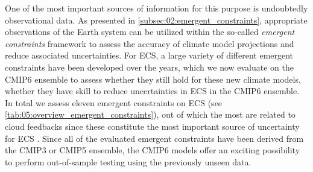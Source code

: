 One of the most important sources of information for this purpose is
undoubtedly observational data. As presented in
\cref{subsec:02:emergent_constraints}, appropriate observations of the Earth
system can be utilized within the so-called \emph{emergent constraints}
framework to assess the accuracy of climate model projections and reduce
associated uncertainties. For \ac{ECS}, a large variety of different emergent
constraints have been developed over the years, which we now evaluate on the
\acs{CMIP}6 ensemble to assess whether they still hold for these new climate
models, \ie{} whether they have skill to reduce uncertainties in \ac{ECS} in
the \acs{CMIP}6 ensemble. In total we assess eleven emergent constraints on
\ac{ECS} (see \cref{tab:05:overview_emergent_constraints}), out of which the
most are related to cloud feedbacks since these constitute the most important
source of uncertainty for \ac{ECS} . Since all of the evaluated emergent
constraints have been derived from the \acs{CMIP}3 or \acs{CMIP}5 ensemble, the
\acs{CMIP}6 models offer an exciting possibility to perform out-of-sample
testing using the previously unseen data.

